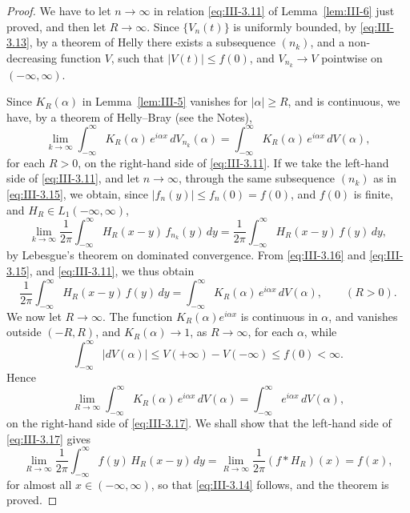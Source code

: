 \begin{proof}
We have to let $n\to\infty$ in relation \eqref{eq:III-3.11} of Lemma~\ref{lem:III-6} just proved, and then let $R\to\infty$. Since $\{V_{n}(t)\}$ is uniformly bounded, by \eqref{eq:III-3.13}, by a theorem of Helly there exists a subsequence $(n_{k})$, and a non-decreasing function $V$, such that $|V(t)|\le f(0)$, and $V_{n_{k}}\to V$ pointwise on $(-\infty,\infty)$.

Since $K_{R}(\alpha)$ in Lemma~\ref{lem:III-5} vanishes for $|\alpha|\ge R$, and is continuous, we have, by a theorem of Helly--Bray (see the Notes),
\begin{equation}\tag{3.15}\label{eq:III-3.15}
\lim_{k\to\infty}\int_{-\infty}^{\infty}K_{R}(\alpha)\,e^{i\alpha x}\,dV_{n_{k}}(\alpha)
=\int_{-\infty}^{\infty}K_{R}(\alpha)\,e^{i\alpha x}\,dV(\alpha),
\end{equation}
for each $R>0$, on the right-hand side of \eqref{eq:III-3.11}. If we take the left-hand side of \eqref{eq:III-3.11}, and let $n\to\infty$, through the same subsequence $(n_{k})$ as in \eqref{eq:III-3.15}, we obtain, since $|f_{n}(y)|\le f_{n}(0)=f(0)$, and $f(0)$ is finite, and $H_{R}\in L_{1}(-\infty,\infty)$,
\begin{equation}\tag{3.16}\label{eq:III-3.16}
\lim_{k\to\infty}\frac{1}{2\pi}\int_{-\infty}^{\infty}H_{R}(x-y)\,f_{n_{k}}(y)\,dy
=\frac{1}{2\pi}\int_{-\infty}^{\infty}H_{R}(x-y)\,f(y)\,dy,
\end{equation}
by Lebesgue's theorem on dominated convergence. From \eqref{eq:III-3.16} and \eqref{eq:III-3.15}, and \eqref{eq:III-3.11}, we thus obtain
\begin{equation}\tag{3.17}\label{eq:III-3.17}
\frac{1}{2\pi}\int_{-\infty}^{\infty}H_{R}(x-y)\,f(y)\,dy
=\int_{-\infty}^{\infty}K_{R}(\alpha)\,e^{i\alpha x}\,dV(\alpha),\qquad(R>0).
\end{equation}
We now let $R\to\infty$. The function $K_{R}(\alpha)e^{i\alpha x}$ is continuous in $\alpha$, and vanishes outside $(-R,R)$, and $K_{R}(\alpha)\to1$, as $R\to\infty$, for each $\alpha$, while
\[
\int_{-\infty}^{\infty}\bigl|dV(\alpha)\bigr|\le V(+\infty)-V(-\infty)\le f(0)<\infty.
\]
Hence
\begin{equation}\tag{3.18}\label{eq:III-3.18}
\lim_{R\to\infty}\int_{-\infty}^{\infty}K_{R}(\alpha)\,e^{i\alpha x}\,dV(\alpha)
=\int_{-\infty}^{\infty}e^{i\alpha x}\,dV(\alpha),
\end{equation}
on the right-hand side of \eqref{eq:III-3.17}. We shall show that the left-hand side of \eqref{eq:III-3.17} gives
\begin{equation}\tag{3.19}\label{eq:III-3.19}
\lim_{R\to\infty}\frac{1}{2\pi}\int_{-\infty}^{\infty}f(y)\,H_{R}(x-y)\,dy
=\lim_{R\to\infty}\frac{1}{2\pi}(f*H_{R})(x)=f(x),
\end{equation}
for almost all $x\in(-\infty,\infty)$, so that \eqref{eq:III-3.14} follows, and the theorem is proved.


\end{proof}
